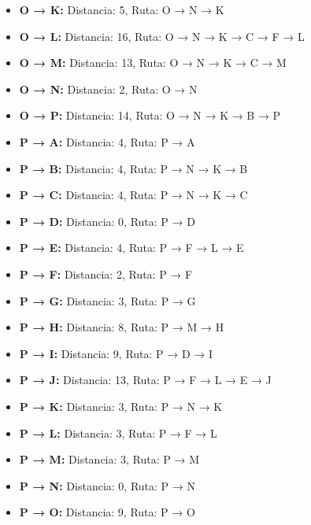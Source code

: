 \documentclass[12pt]{article}
\begin{document}
\begin{itemize}
\item \textbf{O → K:} Distancia: 5, Ruta: O → N → K
\item \textbf{O → L:} Distancia: 16, Ruta: O → N → K → C → F → L
\item \textbf{O → M:} Distancia: 13, Ruta: O → N → K → C → M
\item \textbf{O → N:} Distancia: 2, Ruta: O → N
\item \textbf{O → P:} Distancia: 14, Ruta: O → N → K → B → P
\item \textbf{P → A:} Distancia: 4, Ruta: P → A
\item \textbf{P → B:} Distancia: 4, Ruta: P → N → K → B
\item \textbf{P → C:} Distancia: 4, Ruta: P → N → K → C
\item \textbf{P → D:} Distancia: 0, Ruta: P → D
\item \textbf{P → E:} Distancia: 4, Ruta: P → F → L → E
\item \textbf{P → F:} Distancia: 2, Ruta: P → F
\item \textbf{P → G:} Distancia: 3, Ruta: P → G
\item \textbf{P → H:} Distancia: 8, Ruta: P → M → H
\item \textbf{P → I:} Distancia: 9, Ruta: P → D → I
\item \textbf{P → J:} Distancia: 13, Ruta: P → F → L → E → J
\item \textbf{P → K:} Distancia: 3, Ruta: P → N → K
\item \textbf{P → L:} Distancia: 3, Ruta: P → F → L
\item \textbf{P → M:} Distancia: 3, Ruta: P → M
\item \textbf{P → N:} Distancia: 0, Ruta: P → N
\item \textbf{P → O:} Distancia: 9, Ruta: P → O
\end{itemize}
\end{document}
